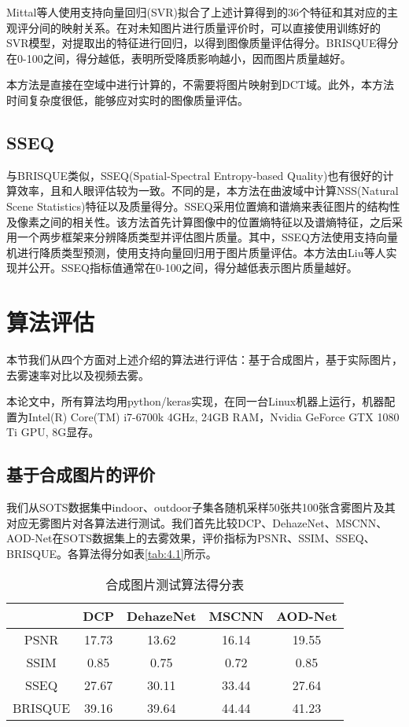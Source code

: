 \documentclass[a4paper, 12pt, oneside]{report}
\begin{document}
{Mittal等人使用支持向量回归(SVR)拟合了上述计算得到的36个特征和其对应的主观评分间的映射关系。在对未知图片进行质量评价时，可以直接使用训练好的SVR模型，对提取出的特征进行回归，以得到图像质量评估得分。BRISQUE得分在0-100之间，得分越低，表明所受降质影响越小，因而图片质量越好。

本方法是直接在空域中进行计算的，不需要将图片映射到DCT域。此外，本方法时间复杂度很低，能够应对实时的图像质量评估。

\subsection{SSEQ\quad}
与BRISQUE类似，SSEQ\cite{ref26}(Spatial-Spectral Entropy-based Quality)也有很好的计算效率，且和人眼评估较为一致。不同的是，本方法在曲波域中计算NSS(Natural Scene Statistics)特征以及质量得分。SSEQ采用位置熵和谱熵来表征图片的结构性及像素之间的相关性。该方法首先计算图像中的位置熵特征以及谱熵特征，之后采用一个两步框架来分辨降质类型并评估图片质量。其中，SSEQ方法使用支持向量机进行降质类型预测，使用支持向量回归用于图片质量评估。本方法由Liu等人实现并公开。SSEQ指标值通常在0-100之间，得分越低表示图片质量越好。

\section{算法评估\quad}
本节我们从四个方面对上述介绍的算法进行评估：基于合成图片，基于实际图片，去雾速率对比以及视频去雾。

本论文中，所有算法均用python/keras实现，在同一台Linux机器上运行，机器配置为Intel(R) Core(TM) i7-6700k 4GHz, 24GB RAM，Nvidia GeForce GTX 1080 Ti GPU, 8G显存。

\subsection{基于合成图片的评价\quad}
我们从SOTS数据集中indoor、outdoor子集各随机采样50张共100张含雾图片及其对应无雾图片对各算法进行测试。我们首先比较DCP、DehazeNet、MSCNN、AOD-Net在SOTS数据集上的去雾效果，评价指标为PSNR、SSIM、SSEQ、BRISQUE。各算法得分如表\ref{tab:4.1}所示。

\begin{table}[htbp]
  \centering
  \caption{合成图片测试算法得分表}
    \begin{tabular}{c|c|c|c|c}
    \hline
         	&	DCP		&	DehazeNet	&	MSCNN	&	AOD-Net	\\
    \hline
    PSNR	&	17.73	& 	13.62		&	16.14	&	{\color{cyan}19.55}	\\
	\hline
    SSIM	&	{\color{cyan}0.85}	&	0.75		&	0.72	&	{\color{cyan}0.85}	\\
	\hline
    SSEQ	&	27.67	&	30.11		&	33.44	&	{\color{cyan}27.64}	\\
    \hline
    BRISQUE	&	{\color{cyan}39.16}	&	39.64		& 	44.44	& 	41.23  	\\
     \hline
  

\end{tabular}
\end{table}}
\end{document}
